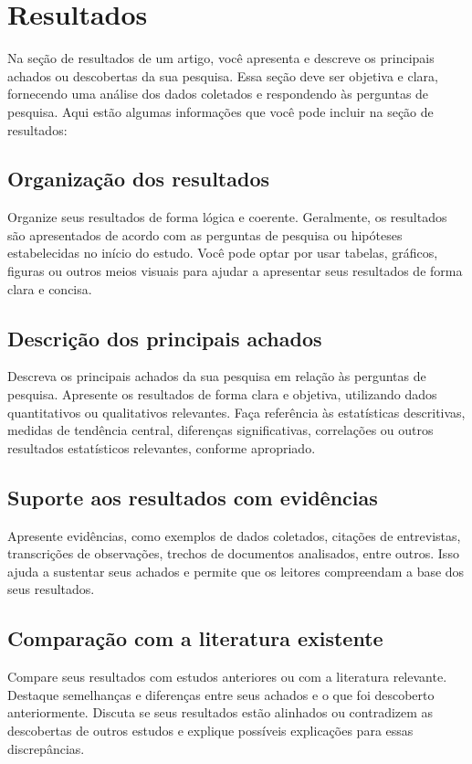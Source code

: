 \section{Resultados}\label{:results}

Na seção de resultados de um artigo, você apresenta e descreve os principais achados ou descobertas da sua pesquisa. Essa seção deve ser objetiva e clara, fornecendo uma análise dos dados coletados e respondendo às perguntas de pesquisa. Aqui estão algumas informações que você pode incluir na seção de resultados:

\subsection{Organização dos resultados}
Organize seus resultados de forma lógica e coerente. Geralmente, os resultados são apresentados de acordo com as perguntas de pesquisa ou hipóteses estabelecidas no início do estudo. Você pode optar por usar tabelas, gráficos, figuras ou outros meios visuais para ajudar a apresentar seus resultados de forma clara e concisa.

\subsection{Descrição dos principais achados}
Descreva os principais achados da sua pesquisa em relação às perguntas de pesquisa. Apresente os resultados de forma clara e objetiva, utilizando dados quantitativos ou qualitativos relevantes. Faça referência às estatísticas descritivas, medidas de tendência central, diferenças significativas, correlações ou outros resultados estatísticos relevantes, conforme apropriado.

\subsection{Suporte aos resultados com evidências}
Apresente evidências, como exemplos de dados coletados, citações de entrevistas, transcrições de observações, trechos de documentos analisados, entre outros. Isso ajuda a sustentar seus achados e permite que os leitores compreendam a base dos seus resultados.

\subsection{Comparação com a literatura existente}
Compare seus resultados com estudos anteriores ou com a literatura relevante. Destaque semelhanças e diferenças entre seus achados e o que foi descoberto anteriormente. Discuta se seus resultados estão alinhados ou contradizem as descobertas de outros estudos e explique possíveis explicações para essas discrepâncias.

